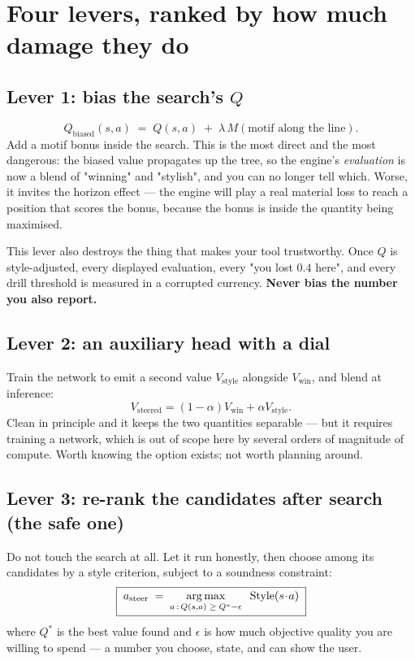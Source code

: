 \section{Four levers, ranked by how much damage they do}

\subsection{Lever 1: bias the search's $Q$}

\[
  Q_{\text{biased}}(s,a) \;=\; Q(s,a) \;+\; \lambda\,M(\text{motif along the line}) .
\]
Add a motif bonus inside the search. This is the most direct and the most dangerous: the
biased value propagates up the tree, so the engine's \emph{evaluation} is now a blend of
"winning" and "stylish", and you can no longer tell which. Worse, it invites the horizon
effect --- the engine will play a real material loss to reach a position that scores the
bonus, because the bonus is inside the quantity being maximised.

\begin{pitfall}
This lever also destroys the thing that makes your tool trustworthy. Once $Q$ is
style-adjusted, every displayed evaluation, every "you lost $0.4$ here", and every drill
threshold is measured in a corrupted currency. \textbf{Never bias the number you also report.}
\end{pitfall}

\subsection{Lever 2: an auxiliary head with a dial}

Train the network to emit a second value $V_{\text{style}}$ alongside $V_{\text{win}}$, and
blend at inference:
\[
  V_{\text{steered}} = (1-\alpha)V_{\text{win}} + \alpha V_{\text{style}} .
\]
Clean in principle and it keeps the two quantities separable --- but it requires training a
network, which is out of scope here by several orders of magnitude of compute. Worth knowing
the option exists; not worth planning around.

\subsection{Lever 3: re-rank the candidates after search (the safe one)}

Do not touch the search at all. Let it run honestly, then choose among its candidates by a
style criterion, subject to a soundness constraint:
\begin{equation}
  \label{eq:constrained}
  \boxed{\;
  a_{\text{steer}} \;=\; \operatorname*{arg\,max}_{a\,:\,Q(s,a)\;\ge\; Q^{*} - \epsilon}\;\; \text{Style}(s\!\cdot\!a)
  \;}
\end{equation}
where $Q^{*}$ is the best value found and $\epsilon$ is how much objective quality you are
willing to spend --- a number you choose, state, and can show the user.

